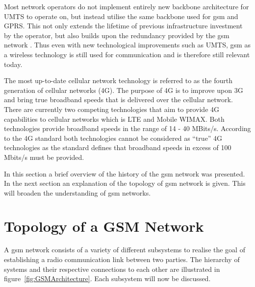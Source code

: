 Most network operators do not implement entirely new backbone architecture for \gls{UMTS}\label{UMTSGSMBackbone} to operate on, but instead utilise the same backbone used for \gls{gsm} and GPRS\@. This not only extends the lifetime of previous infrastructure investment by the operator, but also builds upon the redundancy provided by the \gls{gsm} network \cite{GSMArchitectureProtocolsServices}. Thus even with new technological improvements such as \gls{UMTS}, \gls{gsm} as a wireless technology is still used for communication and is therefore still relevant today.


The most up-to-date cellular network technology is referred to as the fourth generation of cellular networks (4G)\cite{4GWirelessVid}. The purpose of 4G is to improve upon 3G and bring true broadband speeds that is delivered over the cellular network\cite{4GWirelessVid}. There are currently two competing technologies that aim to provide 4G capabilities to cellular networks which is \gls{LTE} and Mobile \gls{WIMAX}\cite{4GWirelessVid}. Both technologies provide broadband speeds in the range of 14 - 40 MBits/s\cite{4GWirelessVid}. According to the 4G standard both technologies cannot be considered as ``true'' 4G technologies as the standard defines that broadband speeds in excess of 100 Mbits/s must be provided\cite{4GWirelessVid}.

In this section a brief overview of the history of the \gls{gsm} network was presented. In the next section an explanation of the topology of \gls{gsm} network is given. This will broaden the understanding of \gls{gsm} networks.
\section{Topology of a GSM Network}
\label{sec:GSMArch}
A \gls{gsm} network consists of a variety of different subsystems to realise the goal of establishing a radio communication link between two parties. The hierarchy of systems and their respective connections to each other are illustrated in figure~\ref{fig:GSMArchitecture}. Each subsystem will now be discussed.

